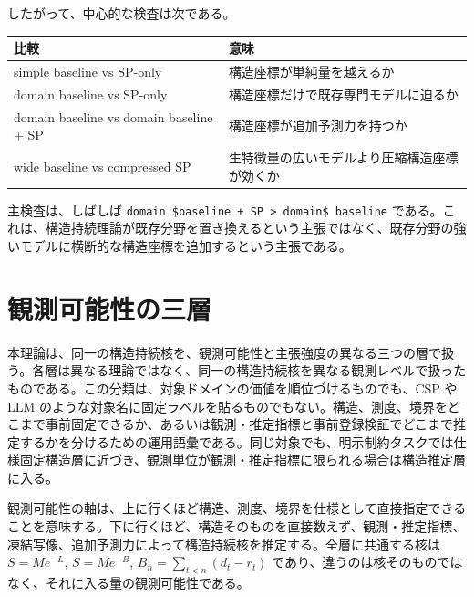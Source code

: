 \documentclass[12pt,a4paper]{article}
\begin{document}
したがって、中心的な検査は次である。

{\def\LTcaptype{table} %
\begin{longtable}[]{@{}
  >{\raggedright\arraybackslash}p{}
  >{\raggedright\arraybackslash}p{}@{}}
\toprule\noalign{}
\begin{minipage}[b]{\linewidth}\raggedright
比較
\end{minipage} & \begin{minipage}[b]{\linewidth}\raggedright
意味
\end{minipage} \\
\midrule\noalign{}
\endhead
\bottomrule\noalign{}
\endlastfoot
simple baseline vs SP-only & 構造座標が単純量を越えるか \\
domain baseline vs SP-only & 構造座標だけで既存専門モデルに迫るか \\
domain baseline vs domain baseline + SP & 構造座標が追加予測力を持つか \\
wide baseline vs compressed SP & 生特徴量の広いモデルより圧縮構造座標が効くか \\
\end{longtable}
}

主検査は、しばしば \texttt{domain\ \$baseline\ +\ SP\ \textgreater{}\ domain\$\ baseline} である。これは、構造持続理論が既存分野を置き換えるという主張ではなく、既存分野の強いモデルに横断的な構造座標を追加するという主張である。

\section{観測可能性の三層}\label{ux89b3ux6e2cux53efux80fdux6027ux306eux4e09ux5c64}

本理論は、同一の構造持続核を、観測可能性と主張強度の異なる三つの層で扱う。各層は異なる理論ではなく、同一の構造持続核を異なる観測レベルで扱ったものである。この分類は、対象ドメインの価値を順位づけるものでも、CSP や LLM のような対象名に固定ラベルを貼るものでもない。構造、測度、境界をどこまで事前固定できるか、あるいは観測・推定指標と事前登録検証でどこまで推定するかを分けるための運用語彙である。同じ対象でも、明示制約タスクでは仕様固定構造層に近づき、観測単位が観測・推定指標に限られる場合は構造推定層に入る。

観測可能性の軸は、上に行くほど構造、測度、境界を仕様として直接指定できることを意味する。下に行くほど、構造そのものを直接数えず、観測・推定指標、凍結写像、追加予測力によって構造持続核を推定する。全層に共通する核は \(S=Me^{-L}\), \(S=Me^{-B}\), \(B_{n}=\sum_{t<n}(d_{t}-r_{t})\) であり、違うのは核そのものではなく、それに入る量の観測可能性である。
\end{document}
